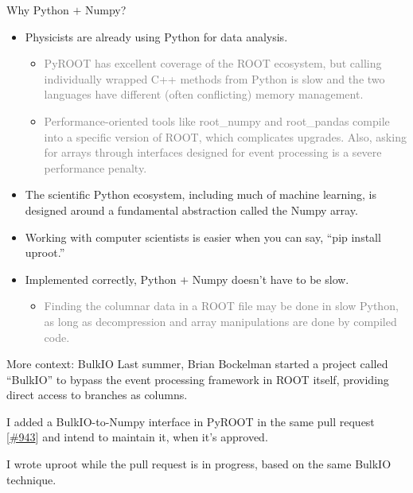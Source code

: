\documentclass[aspectratio=169]{beamer}
\begin{document}
\begin{frame}{Why Python $+$ Numpy?}
\vspace{0.25 cm}
\begin{itemize}\setlength{\itemsep}{0.35 cm}
\item Physicists are already using Python for data analysis.

\begin{itemize}
\item \textcolor{gray}{PyROOT has excellent coverage of the ROOT ecosystem, but calling individually wrapped C++ methods from Python is slow and the two languages have different (often conflicting) memory management.}

\item \textcolor{gray}{Performance-oriented tools like root\_numpy and root\_pandas compile into a specific version of ROOT, which complicates upgrades. Also, asking for arrays through interfaces designed for event processing is a severe performance penalty.}
\end{itemize}

\item The scientific Python ecosystem, including much of machine learning, is designed around a fundamental abstraction called the Numpy array.

\item Working with computer scientists is easier when you can say, ``pip install uproot.''

\item Implemented correctly, Python $+$ Numpy doesn't have to be slow.

\begin{itemize}
\item \textcolor{gray}{Finding the columnar data in a ROOT file may be done in slow Python, as long as decompression and array manipulations are done by compiled code.}
\end{itemize}
\end{itemize}
\end{frame}

\begin{frame}{More context: BulkIO}
\vspace{0.75 cm}
Last summer, Brian Bockelman started a project called ``BulkIO'' to bypass the event processing framework in ROOT itself, providing direct access to branches as columns.

\vspace{0.75 cm}
I added a BulkIO-to-Numpy interface in PyROOT in the same pull request [\textcolor{blue}{\href{https://github.com/root-project/root/pull/943}{\#943}}] and intend to maintain it, when it's approved.

\vspace{0.75 cm}
I wrote uproot while the pull request is in progress, based on the same BulkIO technique.
\end{frame}
\end{document}
